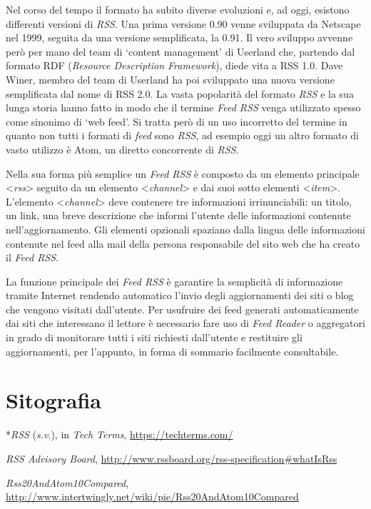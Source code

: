 {{Nel corso del tempo il formato ha subito diverse evoluzioni e, ad oggi,
esistono differenti versioni di \emph{RSS}. Una prima versione 0.90
venne sviluppata da Netscape nel 1999, seguita da una versione
semplificata, la 0.91. Il vero sviluppo avvenne però per mano del team
di `content management' di Userland che, partendo dal formato RDF
(\emph{Resource Description Framework}), diede vita a RSS 1.0. Dave
Winer, membro del team di Userland ha poi sviluppato una nuova versione
semplificata dal nome di RSS 2.0. La vasta popolarità del formato
\emph{RSS} e la sua lunga storia hanno fatto in modo che il termine
\emph{Feed RSS} venga utilizzato spesso come sinonimo di `web feed'. Si
tratta però di un uso incorretto del termine in quanto non tutti i
formati di \emph{feed} sono \emph{RSS}, ad esempio oggi un altro formato
di vasto utilizzo è Atom, un diretto concorrente di \emph{RSS}.

Nella sua forma più semplice un \emph{Feed RSS} è composto da un
elemento principale \textless{}\emph{rss}\textgreater{} seguito da un
elemento \textless{}\emph{channel}\textgreater{} e dai suoi sotto
elementi \textless{}\emph{item}\textgreater{}. L'elemento
\textless{}\emph{channel}\textgreater{} deve contenere tre informazioni
irrinunciabili: un titolo, un link, una breve descrizione che informi
l'utente delle informazioni contenute nell'aggiornamento. Gli elementi
opzionali spaziano dalla lingua delle informazioni contenute nel feed
alla mail della persona responsabile del sito web che ha creato il
\emph{Feed RSS}.

La funzione principale dei \emph{Feed RSS} è garantire la semplicità di
informazione tramite Internet rendendo automatico l'invio degli
aggiornamenti dei siti o blog che vengono visitati dall'utente. Per
usufruire dei feed generati automaticamente dai siti che interessano il
lettore è necessario fare uso di \emph{Feed Reader} o aggregatori in
grado di monitorare tutti i siti richiesti dall'utente e restituire gli
aggiornamenti, per l'appunto, in forma di sommario facilmente
consultabile.

\section*{Sitografia}
{\parindent0pt 
*\emph{RSS} (\emph{s.v}.), in \emph{Tech Terms},
\url{https://techterms.com/}

\emph{RSS Advisory Board},
\url{http://www.rssboard.org/rss-specification\#whatIsRss}

\emph{Rss20AndAtom10Compared},
\url{http://www.intertwingly.net/wiki/pie/Rss20AndAtom10Compared}
}

}}
